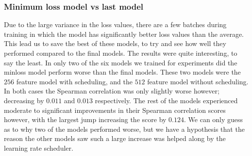 \subsubsection{Minimum loss model vs last model}
Due to the large variance in the loss values, there are a few batches during training in which the model has significantly better loss values than the average. This lead us to save the best of these models, to try and see how well they performed compared to the final models. The results were quite interesting, to say the least. In only two of the six models we trained for experiments did the minloss model perform worse than the final models. These two models were the $256$ feature model with scheduling, and the $512$ feature model without scheduling. In both cases the Spearman correlation was only slightly worse however; decreasing by $0.011$ and $0.013$ respectively. The rest of the models experienced moderate to significant improvements in their Spearman correlation scores however, with the largest jump increasing the score by $0.124$. We can only guess as to why two of the models performed worse, but we have a hypothesis that the reason the other models saw such a large increase was helped along by the learning rate scheduler.